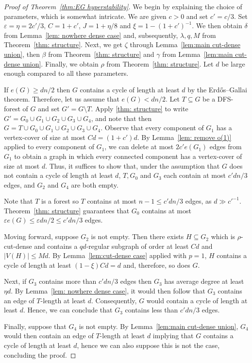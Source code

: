\documentclass[10pt]{article}
\theoremstyle{definition}
\let\leq\leqslant
\let\geq\geqslant
\begin{document}
\begin{proof}[Proof of Theorem~\ref{thm:EG hyperstability}]
    We begin by explaining the choice of parameters, which is somewhat intricate. We are given $c>0$ and set $c'=c/3$. Set $\varepsilon=\eta=2c'/3$, $C=1+c'$, $J=1+\eta/8$ and $\xi = 1-(1+c')^{-1}$. We then obtain $\delta$ from Lemma~\ref{lem: nowhere dense case} and, subsequently, $\lambda,q,M$ from Theorem~\ref{thm: structure}. Next, we get $\zeta$ through Lemma~\ref{lem:main cut-dense union}, then $\beta$ from Theorem~\ref{thm: structure} and $\gamma$ from Lemma~\ref{lem:main cut-dense union}. Finally, we obtain $\rho$ from Theorem~\ref{thm: structure}. Let $d$ be large enough compared to all these parameters.

If $e(G)\geq dn/2$ then $G$ contains a cycle of length at least $d$ by the Erd\H{o}s--Gallai theorem. Therefore, let us assume that $e(G)<dn/2$. Let $T\subseteq G$ be a DFS-forest of $G$ and set $G'=G\setminus T$. Apply \cref{thm: structure} to write $G'=G_0\cup G_1\cup G_2\cup G_3\cup G_4$, and note that then $G=T\cup G_0\cup G_1\cup G_2\cup G_3\cup G_4$. Observe that every component of $G_1$ has a vertex-cover of size at most $Cd=(1+c')d$. By Lemma~\ref{lem: remove o(1)} applied to every component of $G_1$, we can delete at most $2c'e(G_1)$ edges from $G_1$ to obtain a graph in which every connected component has a vertex-cover of size at most $d$. Thus, it suffices to show that, under the assumption that $G$ does not contain a cycle of length at least $d$, $T,G_0$ and $G_3$ each contain at most $c'dn/3$ edges, and $G_2$ and $G_4$ are both empty.
\par Note that $T$ is a forest so $T$ contains at most $n-1\leq c'dn/3$ edges, as $d\gg c'^{-1}$.
Theorem~\ref{thm: structure} guarantees that $G_0$ contains at most $\varepsilon e(G)\leq \varepsilon dn/2\leq c'dn/3$ edges. 

Moving forward, suppose $G_2$ is not empty. Then there exists $H\subseteq G_2$ which is $\rho$-cut-dense and contains a $qd$-regular subgraph of order at least $Cd$ and $|V(H)|\leq Md$. By Lemma~\ref{lem:cut-dense case} applied with $p=1$, $H$ contains a cycle of length at least $(1-\xi)Cd= d$ and, therefore, so does $G$.

Next, if $G_3$ contains more than $c'dn/3$ edges then $G_3$ has average degree at least $\eta d$. By Lemma~\ref{lem: nowhere dense case}, it would then follow that $G_3$ contains an edge of $T$-length at least $d$. Consequently, $G$ would contain a cycle of length at least $d$. Hence, we can conclude that $G_3$ contains less than $c'dn/3$ edges. 

 Finally, suppose that $G_4$ is not empty. By Lemma~\ref{lem:main cut-dense union}, $G_4$ would then contain an edge of $T$-length at least $d$ implying that $G$ contains a cycle of length at least $d$, hence we can also suppose this is not the case, concluding the proof.
\end{proof}
\end{document}
